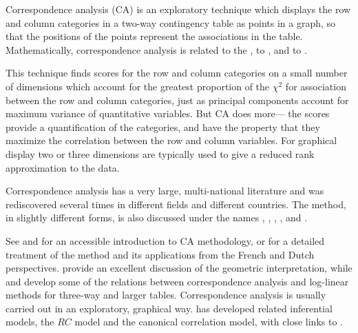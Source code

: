 \documentclass[11pt]{book}\usepackage[]{graphicx}\usepackage[]{color}
\begin{document}
Correspondence analysis (CA) is an exploratory technique which displays
the row and column categories in a two-way contingency table as points
in a graph, so that the positions of the points represent the
associations in the table.
Mathematically, correspondence analysis is related to the ,
to ,
and to .

This technique finds
scores for the row and column categories on a small number of
dimensions which account for the greatest proportion of the
\(\chi^2\) for association between the row and column categories,
just as principal components account for maximum variance
of quantitative variables.  But CA does more---
the scores provide a quantification of the categories,
and have the property that they maximize the correlation
between the row and column variables.   For
graphical display two or three dimensions are typically used to give
a reduced rank approximation to the data.

Correspondence analysis has a very large, multi-national literature and
was rediscovered several times in different fields and different countries.   
The method, in slightly different forms, is also
discussed under the names
, ,
,
,
and .

See \citet{Greenacre:84} and \citet{Greenacre:2007}
for an accessible introduction to CA methodology,
or \citet{Gifi:81,Lebart-etal:84}
for a detailed treatment of the method and its applications
from the French and Dutch perspectives. 
\citet{GreenacreHastie:87} provide an excellent discussion of
the geometric interpretation,
while \citet{HeijdenLeeuw:85} and \citet{Heijden-etal:89}
develop some of the relations between correspondence analysis
and log-linear methods for three-way and larger tables.
Correspondence analysis is usually carried out in an exploratory,
graphical way. 
\citet{Goodman:81,Goodman:85,Goodman:86} has developed related inferential models, the $RC$ model and
the canonical correlation model, with close links to \CA.
\end{document}
